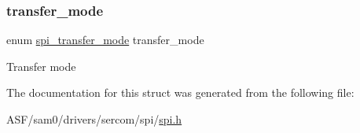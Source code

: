 \subsubsection{\texorpdfstring{transfer\_mode}{transfer\_mode}}
{\footnotesize\ttfamily enum \mbox{\hyperlink{group__asfdoc__sam0__sercom__spi__group_ga9c30fdfffba6be76b4044ccb17b218e5}{spi\+\_\+transfer\+\_\+mode}} transfer\+\_\+mode}

Transfer mode 

The documentation for this struct was generated from the following file\+:\begin{DoxyCompactItemize}
\item 
A\+S\+F/sam0/drivers/sercom/spi/\mbox{\hyperlink{spi_8h}{spi.\+h}}\end{DoxyCompactItemize}
